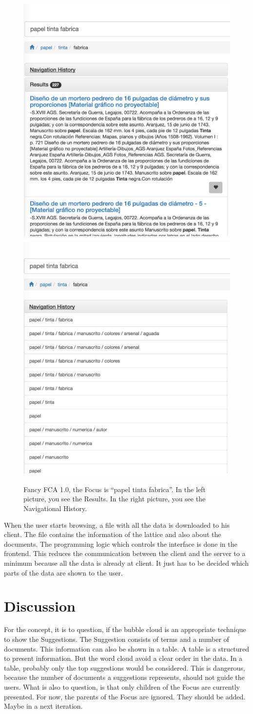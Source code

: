 \documentclass[11pt]{report}
\begin{document}
\begin{figure}[!ht]
\includegraphics[width=.48\linewidth]{images/fancy4}\hfill
\includegraphics[width=.48\linewidth]{images/fancy3}
\caption{Fancy FCA 1.0, the Focus is ``papel tinta fabrica''. In the left picture, you see the Results. In the right picture, you see the Navigational History.}
\label{figure:fancy3}
\end{figure}

When the user starts browsing, a  file with all the data is downloaded to his client. The file contains the information of the lattice and also about the documents. The programming logic which controls the interface is done in the frontend. This reduces the communication between the client and the server to a minimum because all the data is already at client. It just has to be decided which parts of the data are shown to the user.

\section{Discussion}

For the concept, it is to question, if the bubble cloud is an appropriate technique to show the Suggestions. The Suggestion consists of terms and a number of documents. This information can also be shown in a table. A table is a structured to present information. But the word cloud avoid a clear order in the data. In a table, probably only the top suggestions would be considered. This is dangerous, because the number of documents a suggestions represents, should not guide the users. What is also to question, is that only children of the Focus are currently presented. For now, the parents of the Focus are ignored. They should be added. Maybe in a next iteration.\\
\end{document}
